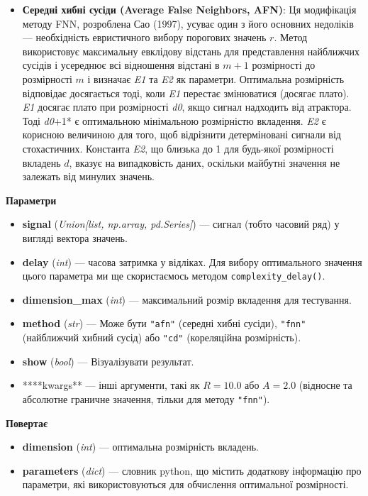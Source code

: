 \documentclass[
  letterpaper,
]{report}
\providecommand{\tightlist}{%
  \setlength{\itemsep}{0pt}\setlength{\parskip}{0pt}}\usepackage{longtable,booktabs,array}
\begin{document}
\begin{itemize}
\tightlist
\item
  \textbf{Середні хибні сусіди (Average False Neighbors, AFN)}: Ця
  модифікація методу FNN, розроблена Сао (1997), усуває один з його
  основних недоліків --- необхідність евристичного вибору порогових
  значень \(r\). Метод використовує максимальну евклідову відстань для
  представлення найближчих сусідів і усереднює всі відношення відстані в
  \(m+1\) розмірності до розмірності \(m\) і визначає \emph{E1} та
  \emph{E2} як параметри. Оптимальна розмірність відповідає досягається
  тоді, коли \emph{E1} перестає змінюватися (досягає плато). \emph{E1}
  досягає плато при розмірності \emph{d0}, якщо сигнал надходить від
  атрактора. Тоді \emph{d0}+1* є оптимальною мінімальною розмірністю
  вкладення. \emph{E2} є корисною величиною для того, щоб відрізнити
  детерміновані сигнали від стохастичних. Константа \emph{E2}, що
  близька до 1 для будь-якої розмірності вкладень \(d\), вказує на
  випадковість даних, оскільки майбутні значення не залежать від минулих
  значень.
\end{itemize}

\textbf{Параметри}

\begin{itemize}
\tightlist
\item
  \textbf{signal} (\emph{Union{[}list, np.array, pd.Series{]}}) ---
  сигнал (тобто часовий ряд) у вигляді вектора значень.
\item
  \textbf{delay} (\emph{int}) --- часова затримка у відліках. Для вибору
  оптимального значення цього параметра ми ще скористаємось методом
  \texttt{complexity\_delay()}.
\item
  \textbf{dimension\_max} (\emph{int}) --- максимальний розмір вкладення
  для тестування.
\item
  \textbf{method} (\emph{str}) --- Може бути \texttt{"afn"} (середні
  хибні сусіди), \texttt{"fnn"} (найближчий хибний сусід) або
  \texttt{"cd"} (кореляційна розмірність).
\item
  \textbf{show} (\emph{bool}) --- Візуалізувати результат.
\item
  ****kwargs** --- інші аргументи, такі як \(R=10.0\) або \(A=2.0\)
  (відносне та абсолютне граничне значення, тільки для методу
  \texttt{"fnn"}).
\end{itemize}

\textbf{Повертає}

\begin{itemize}
\tightlist
\item
  \textbf{dimension} (\emph{int}) --- оптимальна розмірність вкладень.
\item
  \textbf{parameters} (\emph{dict}) --- словник python, що містить
  додаткову інформацію про параметри, які використовуються для
  обчислення оптимальної розмірності.
\end{itemize}
\end{document}
